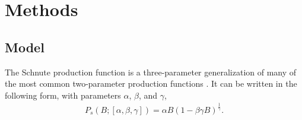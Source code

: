 
%
\section{Methods \label{meth}}


%
\subsection{Model\label{sModel}}

%
The Schnute production function is a three-parameter generalization of many of
the most common two-parameter production functions \cite{deriso_harvesting_1980, schnute_general_1985}. %
It can be written in the following form, with parameters $\alpha$, $\beta$, and $\gamma$,
%
\begin{align}
P_s(B; [\alpha, \beta, \gamma]) = \alpha B (1-\beta\gamma B)^{\frac{1}{\gamma}}.
\end{align}

